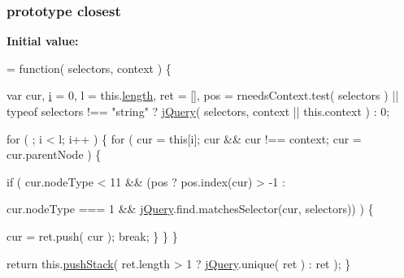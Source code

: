 \subsubsection[{closest}]{ {\bf prototype} closest}\label{jquery-1_810_82-vsdoc_8js_aff450c9c255a1867a5677efa5bed8765}
{\bfseries Initial value\+:}
\begin{DoxyCode}
= \textcolor{keyword}{function}( selectors, context ) \{


        var cur,
            \hyperlink{_bibabook_2_scripts_2respond_8min_8js_a5e25b1d1bed9ab5f3174b76d6a722180}{i} = 0,
            l = this.\hyperlink{jquery-1_810_82-vsdoc_8js_aa7de35d58da66d9944ab9cbe82c19640}{length},
            ret = [],
            pos = rneedsContext.test( selectors ) || typeof selectors !== \textcolor{stringliteral}{"string"} ?
                \hyperlink{jquery-1_810_82-vsdoc_8js_add5237586d970a38a81f990e8eb28c6c}{jQuery}( selectors, context || this.context ) :
                0;

        \textcolor{keywordflow}{for} ( ; i < l; i++ ) \{
            \textcolor{keywordflow}{for} ( cur = \textcolor{keyword}{this}[i]; cur && cur !== context; cur = cur.parentNode ) \{
                
                \textcolor{keywordflow}{if} ( cur.nodeType < 11 && (pos ?
                    pos.index(cur) > -1 :

                    
                    cur.nodeType === 1 &&
                        \hyperlink{jquery-1_810_82-vsdoc_8js_add5237586d970a38a81f990e8eb28c6c}{jQuery}.find.matchesSelector(cur, selectors)) ) \{

                    cur = ret.push( cur );
                    \textcolor{keywordflow}{break};
                \}
            \}
        \}

        \textcolor{keywordflow}{return} this.\hyperlink{jquery-1_810_82-vsdoc_8js_afc3a7db1ef2b526338c06c07cecccd44}{pushStack}( ret.length > 1 ? \hyperlink{jquery-1_810_82-vsdoc_8js_add5237586d970a38a81f990e8eb28c6c}{jQuery}.unique( ret ) : ret );
    \}
\end{DoxyCode}
\hypertarget{jquery-1_810_82-vsdoc_8js_ac8c7ab4467fc25f40e85c72221a1f10b}{}
